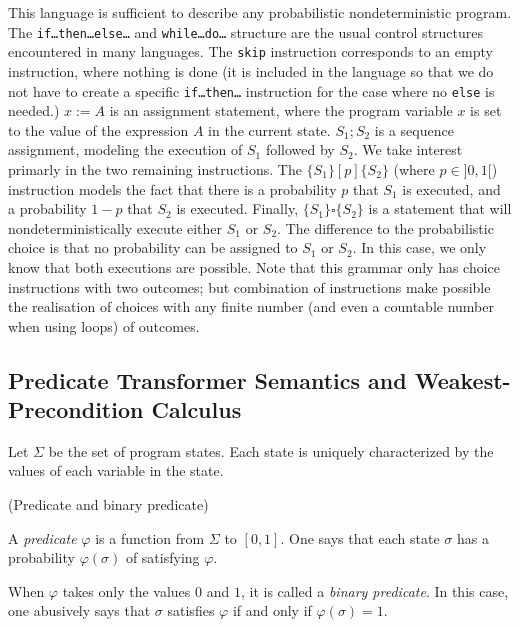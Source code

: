 \documentclass[a4paper,10pt]{llncs}
\begin{document}
This language is sufficient to describe any probabilistic nondeterministic program. The \texttt{if\dots then\dots else\dots} and \texttt{while\dots do\dots} structure are the usual control structures encountered in many languages. The \texttt{skip} instruction corresponds to an empty instruction, where nothing is done (it is included in the language so that we do not have to create a specific \texttt{if\dots then\dots} instruction for the case where no \texttt{else} is needed.) $x := A$ is an assignment statement, where the program variable $x$ is set to the value of the expression $A$ in the current state. $S_1 ; S_2$ is a sequence assignment, modeling the execution of $S_1$ followed by $S_2$. We take interest primarly in the two remaining instructions.\newline
The $\{S_1\} [p] \{S_2\}$ (where $p \in ]0,1[$) instruction models the fact that there is a probability $p$ that $S_1$ is executed, and a probability $1-p$ that $S_2$ is executed. Finally, $\{S_1\} \square \{S_2\} $ is a statement that will nondeterministically execute either $S_1$ or $S_2$. The difference to the probabilistic choice is that no probability can be assigned to $S_1$ or $S_2$. In this case, we only know that both executions are possible.\newline
Note that this grammar only has choice instructions with two outcomes; but combination of instructions make possible the realisation of choices with any finite number (and even a countable number when using loops) of outcomes.\bigskip

	\subsection{Predicate Transformer Semantics and Weakest-Precondition Calculus}
	Let $\Sigma$ be the set of program states. Each state is uniquely characterized by the values of each variable in the state.\bigskip
	
	\begin{definition}{\textnormal{(Predicate and binary predicate)}}
	\item A \emph{predicate} $\varphi$ is a function from $\Sigma$ to $[0,1]$. One says that each state $\sigma$ has a probability $\varphi(\sigma)$ of satisfying $\varphi$.
	\item When $\varphi$ takes only the values $0$ and $1$, it is called a \emph{binary predicate}. In this case, one abusively says that $\sigma$ satisfies $\varphi$ if and only if $\varphi(\sigma) = 1$.
	\end{definition}
\end{document}
